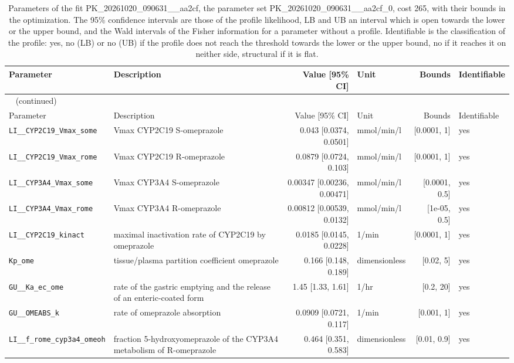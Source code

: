 \begin{longtable}{llrlrl}
\caption{Parameters of the fit PK\_20261020\_090631\_\_aa2cf, the parameter set PK\_20261020\_090631\_\_aa2cf\_0, cost 265, with their bounds in the optimization. The 95\% confidence intervals are those of the profile likelihood, LB and UB an interval which is open towards the lower or the upper bound, and the Wald intervals of the Fisher information for a parameter without a profile. Identifiable is the classification of the profile: yes, no (LB) or no (UB) if the profile does not reach the threshold towards the lower or the upper bound, no if it reaches it on neither side, structural if it is flat.}\label{tab:parameters:PK_20261020_090631__aa2cf} \\
\toprule
Parameter & Description & Value [95\% CI] & Unit & Bounds & Identifiable \\
\midrule
\endfirsthead
\multicolumn{6}{l}{\small\tablename~\thetable{} (continued)} \\
\toprule
Parameter & Description & Value [95\% CI] & Unit & Bounds & Identifiable \\
\midrule
\endhead
\bottomrule
\endlastfoot
\texttt{LI\_\_CYP2C19\_Vmax\_some} & Vmax CYP2C19 S-omeprazole & 0.043 [0.0374, 0.0501] & mmol/min/l & [0.0001, 1] & yes \\
\texttt{LI\_\_CYP2C19\_Vmax\_rome} & Vmax CYP2C19 R-omeprazole & 0.0879 [0.0724, 0.103] & mmol/min/l & [0.0001, 1] & yes \\
\texttt{LI\_\_CYP3A4\_Vmax\_some} & Vmax CYP3A4 S-omeprazole & 0.00347 [0.00236, 0.00471] & mmol/min/l & [0.0001, 0.5] & yes \\
\texttt{LI\_\_CYP3A4\_Vmax\_rome} & Vmax CYP3A4 R-omeprazole & 0.00812 [0.00539, 0.0132] & mmol/min/l & [1e-05, 0.5] & yes \\
\texttt{LI\_\_CYP2C19\_kinact} & maximal inactivation rate of CYP2C19 by omeprazole & 0.0185 [0.0145, 0.0228] & 1/min & [0.0001, 1] & yes \\
\texttt{Kp\_ome} & tissue/plasma partition coefficient omeprazole & 0.166 [0.148, 0.189] & dimensionless & [0.02, 5] & yes \\
\texttt{GU\_\_Ka\_ec\_ome} & rate of the gastric emptying and the release of an enteric-coated form & 1.45 [1.33, 1.61] & 1/hr & [0.2, 20] & yes \\
\texttt{GU\_\_OMEABS\_k} & rate of omeprazole absorption & 0.0909 [0.0721, 0.117] & 1/min & [0.001, 1] & yes \\
\texttt{LI\_\_f\_rome\_cyp3a4\_omeoh} & fraction 5-hydroxyomeprazole of the CYP3A4 metabolism of R-omeprazole & 0.464 [0.351, 0.583] & dimensionless & [0.01, 0.9] & yes \\

\end{longtable}
